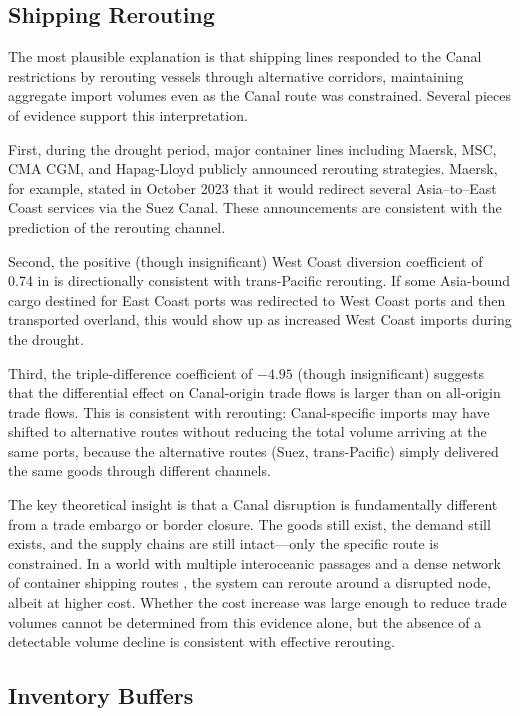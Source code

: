 \documentclass[12pt]{article}
\begin{document}
\subsection{Shipping Rerouting}

The most plausible explanation is that shipping lines responded to the Canal restrictions by rerouting vessels through alternative corridors, maintaining aggregate import volumes even as the Canal route was constrained. Several pieces of evidence support this interpretation.

First, during the drought period, major container lines including Maersk, MSC, CMA CGM, and Hapag-Lloyd publicly announced rerouting strategies. Maersk, for example, stated in October 2023 that it would redirect several Asia--to--East Coast services via the Suez Canal. These announcements are consistent with the prediction of the rerouting channel.

Second, the positive (though insignificant) West Coast diversion coefficient of 0.74 in  is directionally consistent with trans-Pacific rerouting. If some Asia-bound cargo destined for East Coast ports was redirected to West Coast ports and then transported overland, this would show up as increased West Coast imports during the drought.

Third, the triple-difference coefficient of $-4.95$ (though insignificant) suggests that the differential effect on Canal-origin trade flows is larger than on all-origin trade flows. This is consistent with rerouting: Canal-specific imports may have shifted to alternative routes without reducing the total volume arriving at the same ports, because the alternative routes (Suez, trans-Pacific) simply delivered the same goods through different channels.

The key theoretical insight is that a Canal disruption is fundamentally different from a trade embargo or border closure. The goods still exist, the demand still exists, and the supply chains are still intact---only the specific route is constrained. In a world with multiple interoceanic passages and a dense network of container shipping routes \citep{brancaccio2020geography, brancaccio2023search}, the system can reroute around a disrupted node, albeit at higher cost. Whether the cost increase was large enough to reduce trade volumes cannot be determined from this evidence alone, but the absence of a detectable volume decline is consistent with effective rerouting.

\subsection{Inventory Buffers}
\end{document}
